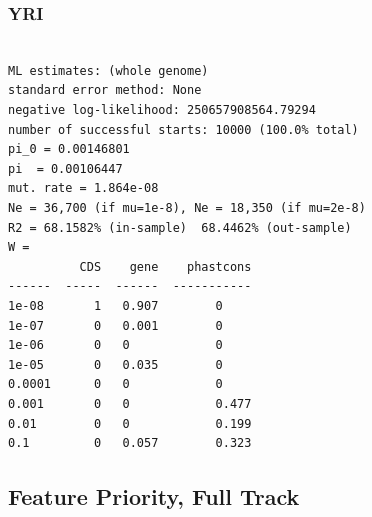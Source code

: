 \documentclass[11pt]{article}
\begin{document}
\subsubsection*{YRI}
\begin{minipage}{\linewidth}\begin{footnotesize}
\begin{verbatim}

ML estimates: (whole genome)
standard error method: None
negative log-likelihood: 250657908564.79294
number of successful starts: 10000 (100.0% total)
pi_0 = 0.00146801
pi  = 0.00106447
mut. rate = 1.864e-08 
Ne = 36,700 (if mu=1e-8), Ne = 18,350 (if mu=2e-8)
R2 = 68.1582% (in-sample)  68.4462% (out-sample)
W = 
          CDS    gene    phastcons
------  -----  ------  -----------
1e-08       1   0.907        0
1e-07       0   0.001        0
1e-06       0   0            0
1e-05       0   0.035        0
0.0001      0   0            0
0.001       0   0            0.477
0.01        0   0            0.199
0.1         0   0.057        0.323
\end{verbatim}
\end{footnotesize}\end{minipage}


\subsection{Feature Priority, Full Track}
\end{document}
